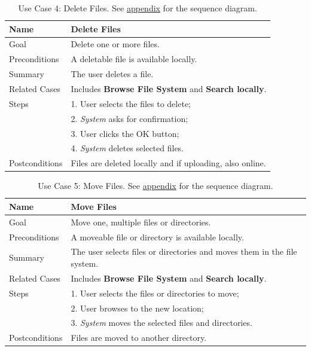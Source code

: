 \begin{table}[h!]
\centering
\begin{tabular}{|l|l|}
\hline
Name & Delete Files\\ \hline
Goal & Delete one or more files.\\ \hline
Preconditions & A deletable file is available locally. \\ \hline
Summary & The user deletes a file.\\ \hline
Related Cases & Includes \textbf{Browse File System} and \textbf{Search locally}. \\ \hline
Steps &  1. User selects the files to delete; \\
      &  2. \textit{System} asks for confirmation; \\ 
      &  3. User clicks the OK button; \\
      &  4. \textit{System} deletes selected files. 
        \\ \hline
Postconditions & Files are deleted locally and if uploading, also online.
\\ \hline
\end{tabular}
\caption{Use Case 4: Delete Files. See \hyperref[fig:req_seq2]{appendix} for the sequence diagram.}
\label{tab:UC4}
\end{table}

\begin{table}[h!]
\centering
\begin{tabular}{|l|l|}
\hline
Name & Move Files\\ \hline
Goal & Move one, multiple files or directories.\\ \hline
Preconditions & A moveable file or directory is available locally. \\ \hline
Summary & The user selects files or directories and moves them in the file system.\\ \hline
Related Cases & Includes \textbf{Browse File System} and \textbf{Search locally}. \\ \hline
Steps &  1. User selects the files or directories to move; \\
      &  2. User browses to the new location; \\
      &  3. \textit{System} moves the selected files and directories. 
        \\ \hline
Postconditions & Files are moved to another directory.
\\ \hline
\end{tabular}
\caption{Use Case 5: Move Files. See \hyperref[fig:req_seq2]{appendix} for the sequence diagram.}
\label{tab:UC5}
\end{table}

